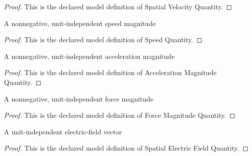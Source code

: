 \begin{proof}
  This is the declared model definition of Spatial Velocity Quantity.
\end{proof}
\begin{definition}
  \label{def:physics:phyx-mini-0958:phyxminiproblems-problemphyxmini0958-speedquantity}
  A nonnegative, unit-independent speed magnitude
\end{definition}
\begin{proof}
  This is the declared model definition of Speed Quantity.
\end{proof}
\begin{definition}
  \label{def:physics:phyx-mini-0958:phyxminiproblems-problemphyxmini0958-accelerationmagnitudequantity}
  A nonnegative, unit-independent acceleration magnitude
\end{definition}
\begin{proof}
  This is the declared model definition of Acceleration Magnitude Quantity.
\end{proof}
\begin{definition}
  \label{def:physics:phyx-mini-0958:phyxminiproblems-problemphyxmini0958-forcemagnitudequantity}
  A nonnegative, unit-independent force magnitude
\end{definition}
\begin{proof}
  This is the declared model definition of Force Magnitude Quantity.
\end{proof}
\begin{definition}
  \label{def:physics:phyx-mini-0958:phyxminiproblems-problemphyxmini0958-spatialelectricfieldquantity}
  A unit-independent electric-field vector
\end{definition}
\begin{proof}
  This is the declared model definition of Spatial Electric Field Quantity.
\end{proof}
